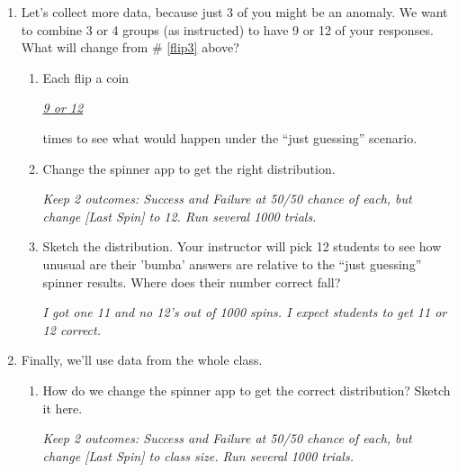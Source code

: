 \begin{enumerate}
  \item Let's collect more data, because just 3 of you might be an
    anomaly.  We want to combine 3 or 4 groups (as instructed) to have
    9 or 12 of your
    responses. What will change from \# \ref{flip3} above? \\
    \begin{enumerate}
    \item Each flip a coin \underline{\hspace{.5in}} 
\begin{key}
   {\it \underline{9 or 12}}
\end{key}
        times to see
      what would happen under the ``just guessing'' scenario. 
    \item Change the spinner app to get the right  distribution.
\begin{students}
  \vspace{2cm}
\end{students}    
\begin{key}
   {\it Keep 2 outcomes: Success and Failure at 50/50 chance of each,
     but change [Last Spin] to 12. Run several 1000 trials. }
\end{key}
   

\item Sketch the distribution. Your instructor will pick 12 students
  to see how unusual are their 'bumba' answers are relative to the
  ``just guessing'' spinner results. Where does their number
  correct fall?
\begin{students}
  \vspace{3cm}
\end{students}    
\begin{key}
   {\it I got one 11 and no 12's out of 1000 spins. I expect students
     to get 11 or 12 correct.}
\end{key}
    \end{enumerate}


\item Finally, we'll use data from the whole class. 
    \begin{enumerate}
    \item How do we change the spinner app to get the correct
      distribution?  Sketch it here.
\begin{students}
  \vspace{4cm}
\end{students}    
\begin{key}
   {\it Keep 2 outcomes: Success and Failure at 50/50 chance of each,
     but change [Last Spin] to class size. Run several 1000 trials. }
\end{key}


\end{enumerate}
\end{enumerate}
